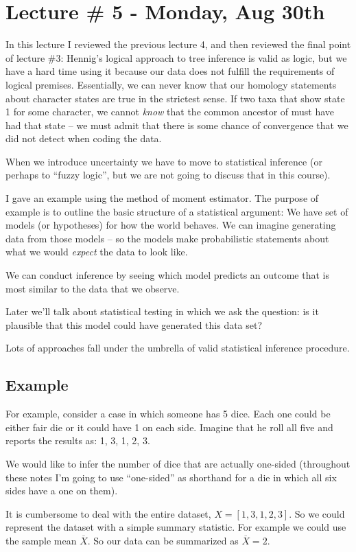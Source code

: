\documentclass[11pt]{article}
\begin{document}
\section*{Lecture \# 5 - Monday, Aug 30th}
In this lecture I reviewed the previous lecture 4, and then reviewed the final point of lecture \#3: Hennig's logical approach to tree inference is valid as logic, but we have a hard time using it because our data does not fulfill the requirements of logical premises.  Essentially, we can never know that our homology statements about character states are true in the strictest sense. If two taxa that show state 1 for some character, we cannot {\em know} that the common ancestor of must have had that state -- we must admit that there is some chance of convergence that we did not detect when coding the data.

When we introduce uncertainty we have to move to statistical inference (or perhaps to ``fuzzy logic'', but we are not going to discuss that in this course).

I gave an example using the method of moment estimator.  The purpose of example is to outline the basic structure of a statistical argument: We have set of models (or hypotheses) for how the world behaves.
We can imagine generating data from those models -- so the models make probabilistic statements about what we would {\em expect} the data to look like.

We can conduct inference by seeing which model predicts an outcome that is most similar to the data that we observe.

Later we'll talk about statistical testing in which we ask the question: is it plausible that this model could have generated this data set?

Lots of approaches fall under the umbrella of valid statistical inference procedure.

\subsection*{Example}
For example, consider a case in which someone has 5 dice. Each one could be either fair die or it could have 1 on each side.  Imagine that he roll all five and reports the results as: 1, 3, 1, 2, 3.

We would like to infer the number of dice that are actually one-sided (throughout these notes I'm going to use ``one-sided'' as shorthand for a die in which all six sides have a one on them).

It is cumbersome to deal with the entire dataset, $X = [1, 3, 1, 2, 3]$.  So we could represent the dataset with a simple summary statistic.  For example we could use the sample mean $\overline{X}$.  So our data can be summarized as  $\overline{X}=2$.
\end{document}
